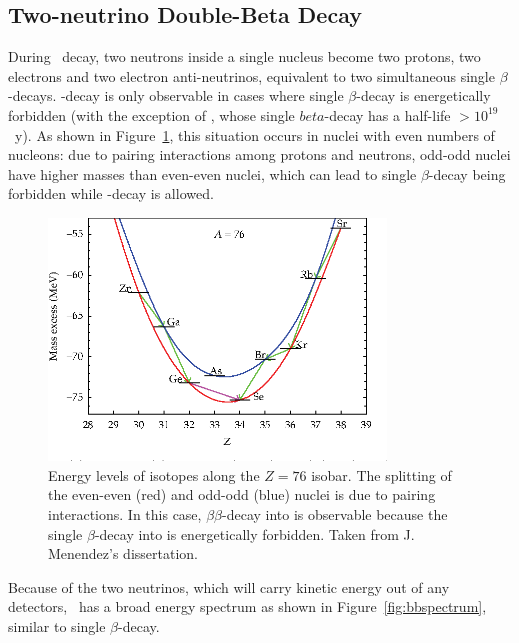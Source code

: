 \documentclass[/main.tex]{subfiles}
\begin{document}
\subsection{Two-neutrino Double-Beta Decay}
During \tnbb\ decay, two neutrons inside a single nucleus become two protons, two electrons and two electron anti-neutrinos, equivalent to two simultaneous single $\beta$-decays.
\bb -decay is only observable in cases where single $\beta$-decay is energetically forbidden (with the exception of , whose single $beta$-decay has a half-life $>10^{19}$~y).
As shown in Figure~\ref{fig:bballowed}, this situation occurs in nuclei with even numbers of nucleons: due to pairing interactions among protons and neutrons, odd-odd nuclei have higher masses than even-even nuclei, which can lead to single $\beta$-decay being forbidden while \bb -decay is allowed.
\begin{figure}[t]
  \centering
  \includegraphics[width=0.8\textwidth]{bballowed}
  \caption[Allowed $\beta\beta$ Isobar]{\label{fig:bballowed}
    Energy levels of isotopes along the $Z=76$ isobar. The splitting of the even-even (red) and odd-odd (blue) nuclei is due to pairing interactions. In this case,  $\beta\beta$-decay into  is observable because the single $\beta$-decay into  is energetically forbidden. Taken from J. Menendez's dissertation.
  }
\end{figure}
Because of the two neutrinos, which will carry kinetic energy out of any detectors, \tnbb\ has a broad energy spectrum as shown in Figure~\ref{fig:bbspectrum}, similar to single $\beta$-decay.
\end{document}
